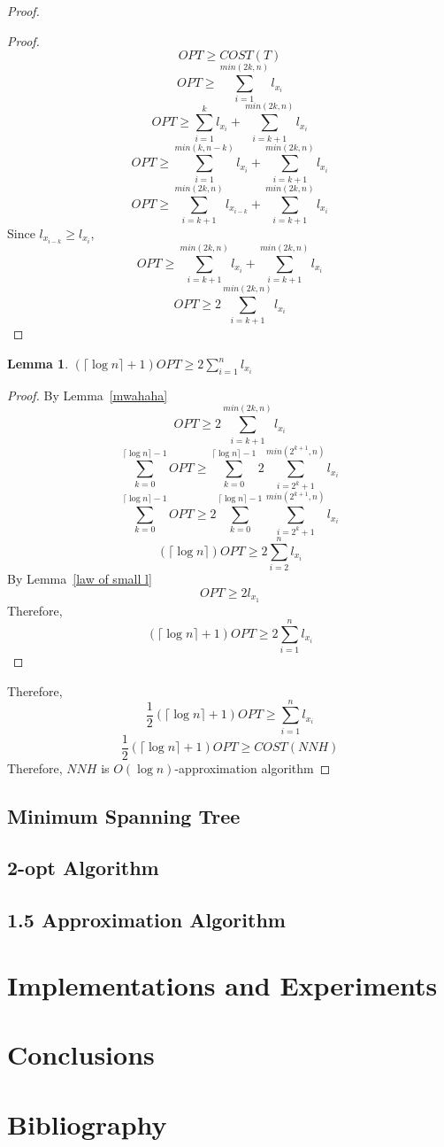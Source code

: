 \documentclass[paper=a4, fontsize=11pt]{scrartcl}	%
\numberwithin{equation}{section}		%
\numberwithin{figure}{section}			%
\numberwithin{table}{section}				%
\newtheorem{lemma}{Lemma}
\begin{document}
\begin{proof}
\begin{proof}
\[OPT\geq COST(T)\]
\[OPT\geq \sum\limits_{i=1}^{min(2k,n)}l_{x_i}\]
\[OPT\geq \sum\limits_{i=1}^{k}l_{x_i} + \sum\limits_{i=k+1}^{min(2k,n)}l_{x_i}\]
\[OPT\geq \sum\limits_{i=1}^{min(k,n-k)}l_{x_{i}} + \sum\limits_{i=k+1}^{min(2k,n)}l_{x_i}\]
\[OPT\geq \sum\limits_{i=k+1}^{min(2k,n)}l_{x_{i-k}} + \sum\limits_{i=k+1}^{min(2k,n)}l_{x_i}\]
Since $l_{x_{i-k}}\geq l_{x_{i}}$,
\[OPT\geq \sum\limits_{i=k+1}^{min(2k,n)}l_{x_{i}} + \sum\limits_{i=k+1}^{min(2k,n)}l_{x_i}\]
\[OPT\geq 2\sum\limits_{i=k+1}^{min(2k,n)}l_{x_i}\]
\end{proof}
\begin{lemma}
$(\lceil\log n\rceil+1)OPT\geq 2\sum\limits_{i=1}^{n}l_{x_i}$
\end{lemma}
\begin{proof}
By Lemma~\ref{mwahaha}
\[OPT\geq 2\sum\limits_{i=k+1}^{min(2k,n)}l_{x_i}\]
\[\sum\limits_{k=0}^{\lceil{\log n}\rceil-1}{OPT}\geq \sum\limits_{k=0}^{\lceil{\log n}\rceil-1}2\sum\limits_{i=2^{k}+1}^{min(2^{k+1},n)}l_{x_i}\]
\[\sum\limits_{k=0}^{\lceil{\log n}\rceil-1}{OPT}\geq 2\sum\limits_{k=0}^{\lceil{\log n}\rceil-1}\sum\limits_{i=2^{k}+1}^{min(2^{k+1},n)}l_{x_i}\]
\[(\lceil\log n\rceil)OPT\geq 2\sum\limits_{i=2}^{n}l_{x_i}\]
By Lemma~\ref{law of small l}
\[OPT\geq 2l_{x_{1}}\]
Therefore,
\[(\lceil\log n\rceil+1)OPT\geq 2\sum\limits_{i=1}^{n}l_{x_i}\]
\end{proof}
Therefore,
\[\frac{1}{2}(\lceil\log n\rceil+1)OPT\geq\sum\limits_{i=1}^{n}l_{x_i}\]
\[\frac{1}{2}(\lceil\log n\rceil+1)OPT\geq COST(NNH)\]
Therefore, $NNH$ is $O(\log n)$-approximation algorithm
\end{proof}

\subsection{Minimum Spanning Tree}
\subsection{2-opt Algorithm}
\subsection{1.5 Approximation Algorithm}

\section{Implementations and Experiments}

\section{Conclusions}

\section{Bibliography}

\nocite{*}

\end{document}
